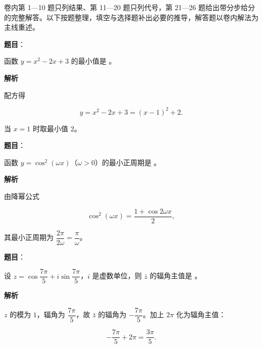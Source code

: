 

卷内第 1—10 题只列结果、第 11—20 题只列代号，第 21—26 题给出带分步给分的完整解答。以下按题整理，填空与选择题补出必要的推导，解答题以卷内解法为主线重述。


\begin{answer}

\textbf{题目}：

函数 $y=x^2-2x+3$ 的最小值是 \gkblank{}。

\textbf{解析}

配方得

\nopagebreak[4]
\[
y=x^2-2x+3=(x-1)^2+2.
\]

当 $x=1$ 时取最小值 $2$。


\end{answer}
\begin{answer}

\textbf{题目}：

函数 $y=\cos^2(\omega x)$（$\omega>0$）的最小正周期是 \gkblank{}。

\textbf{解析}

由降幂公式

\nopagebreak[4]
\[
\cos^2(\omega x)=\frac{1+\cos 2\omega x}{2},
\]

其最小正周期为 $\dfrac{2\pi}{2\omega}=\dfrac{\pi}{\omega}$。


\end{answer}
\begin{answer}

\textbf{题目}：

设 $z=\cos\dfrac{7\pi}{5}+i\sin\dfrac{7\pi}{5}$，$i$ 是虚数单位，则 $\bar z$ 的辐角主值是 \gkblank{}。

\textbf{解析}

$z$ 的模为 $1$，辐角为 $\dfrac{7\pi}{5}$，故 $\bar z$ 的辐角为 $-\dfrac{7\pi}{5}$。加上 $2\pi$ 化为辐角主值：

\nopagebreak[4]
\[
-\frac{7\pi}{5}+2\pi=\frac{3\pi}{5}.
\]


\end{answer}
